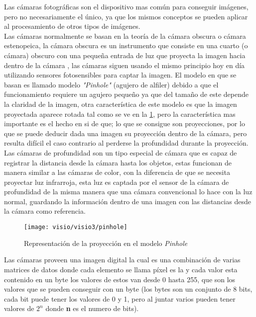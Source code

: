     
    Las cámaras fotográficas son el dispositivo mas común para conseguir imágenes, pero no necesariamente el único, ya que los mismos conceptos se pueden aplicar al procesamiento de otros tipos de imágenes.\\
    Las cámaras normalmente se basan en la teoría de la cámara obscura o cámara estenopeica, la cámara obscura es un instrumento que consiste en una cuarto (o cámara) obscuro con una pequeña entrada de luz que proyecta la imagen hacia dentro de la cámara , las cámaras siguen usando el mismo principio hoy en día utilizando sensores fotosensibles para captar la imagen. El modelo en que se basan es llamado modelo \textit{"Pinhole"} (agujero de alfiler) debido a que el funcionamiento requiere un agujero pequeño ya que del tamaño de este depende la claridad de la imagen, otra característica de este modelo es que la imagen proyectada aparece rotada tal como se ve en la \cref{fig:pinhole}, pero la característica mas importante es el hecho en si de que; lo que se consigue son proyecciones, por lo que se puede deducir dada una imagen su proyección dentro de la cámara, pero resulta difícil el caso contrario al perderse la profundidad durante la proyección. Las cámaras de profundidad son un tipo especial de cámara que es capaz de registrar la distancia desde la cámara hasta los objetos, estas funcionan de manera similar a las cámaras de color, con la diferencia de que se necesita proyectar luz  infrarroja, esta luz es captada por el sensor de la cámara de profundidad de la misma manera que una cámara convencional lo hace con la luz normal, guardando la información dentro de una imagen con las distancias desde la cámara como referencia.
    
    \begin{figure}[h]
    	\centering
    	\texttt{[image: visio/visio3/pinhole]}
    	\caption{Representación de la proyección en el modelo \textit{Pinhole}}
    	\label{fig:pinhole}
    \end{figure}
    
    Las cámaras proveen una imagen digital la cual es una combinación de varias matrices de datos donde cada elemento se llama píxel es la y cada valor esta contenido en un byte los valores de estos van desde 0 hasta 255, que son los valores que se pueden conseguir con un byte (los bytes son un conjunto de 8 bits, cada bit puede tener los valores de 0 y 1, pero al juntar varios pueden tener valores de $2^n$ donde \textbf{n} es el numero de bits).
    
